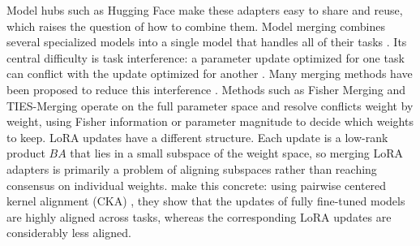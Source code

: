 \documentclass[10pt]{article} %
\begin{document}
    Model hubs such as Hugging Face make these adapters easy to share and reuse, which raises the question of how to combine them. Model merging combines several specialized models into a single model that handles all of their tasks \citep{wortsman2022model}. Its central difficulty is task interference: a parameter update optimized for one task can conflict with the update optimized for another \citep{yadav2023ties}. Many merging methods have been proposed to reduce this interference \citep{davari2024model,ilharco2022editing,matena2022merging,wortsman2022model,yadav2023ties,yu2024language,lu2024twin,yang2026model,deep2024della,miyano2025adaptive,chen2025black}. Methods such as Fisher Merging and TIES-Merging operate on the full parameter space and resolve conflicts weight by weight, using Fisher information or parameter magnitude to decide which weights to keep. LoRA updates have a different structure. Each update is a low-rank product $BA$ that lies in a small subspace of the weight space, so merging LoRA adapters is primarily a problem of aligning subspaces rather than reaching consensus on individual weights. \citet{stoica2025model} make this concrete: using pairwise centered kernel alignment (CKA) \citep{kornblith2019similarity}, they show that the updates of fully fine-tuned models are highly aligned across tasks, whereas the corresponding LoRA updates are considerably less aligned.
\end{document}
